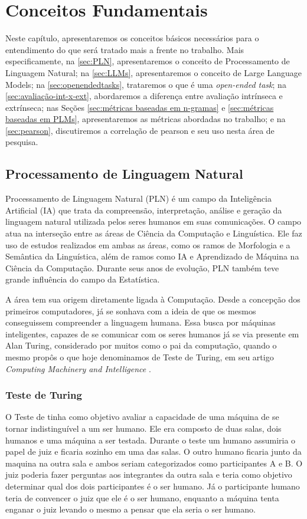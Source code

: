 \documentclass[cic,tc]{iiufrgs}
\begin{document}
\chapter{Conceitos Fundamentais}
\label{cap:conceitos fundamentais}
Neste capítulo, apresentaremos os conceitos básicos necessários para o entendimento do que será tratado mais a frente no trabalho. Mais especificamente, na \autoref{sec:PLN}, apresentaremos o conceito de Processamento de Linguagem Natural; na \autoref{sec:LLMs}, apresentaremos o conceito de Large Language Models; na \autoref{sec:openendedtasks}, trataremos o que é uma \textit{open-ended task}; na \autoref{sec:avaliação-int-x-ext}, abordaremos a diferença entre avaliação intrínseca e extrínseca; nas Seções \ref{sec:métricas baseadas em n-gramas} e \ref{sec:métricas baseadas em PLMs}, apresentaremos as métricas abordadas no trabalho; e na \autoref{sec:pearson}, discutiremos a correlação de pearson e seu uso nesta área de pesquisa.

\section{Processamento de Linguagem Natural}
\label{sec:PLN}
Processamento de Linguagem Natural (PLN) é um campo da Inteligência Artificial (IA) que trata da compreensão, interpretação, análise e geração da linguagem natural utilizada pelos seres humanos em suas comunicações. O campo atua na interseção entre as áreas de Ciência da Computação e Linguística. Ele faz uso de estudos realizados em ambas as áreas, como os ramos de Morfologia e a Semântica da Linguística, além de ramos como IA e Aprendizado de Máquina na Ciência da Computação. Durante seus anos de evolução, PLN também teve grande influência do campo da Estatística.

A área tem sua origem diretamente ligada à Computação. Desde a concepção dos primeiros computadores, já se sonhava com a ideia de que os mesmos conseguissem compreender a linguagem humana. Essa busca por máquinas inteligentes, capazes de se comunicar com os seres humanos já se via presente em Alan Turing, considerado por muitos como o pai da computação, quando o mesmo propôs o que hoje denominamos de Teste de Turing, em seu artigo \textit{Computing Machinery and Intelligence} \cite{alan1950a}. 

\subsection{Teste de Turing}
O Teste de \citet{alan1950a} tinha como objetivo avaliar a capacidade de uma máquina de se tornar indistinguível a um ser humano. Ele era composto de duas salas, dois humanos e uma máquina a ser testada. Durante o teste um humano assumiria o papel de juiz e ficaria sozinho em uma das salas. O outro humano ficaria junto da maquina na outra sala e ambos seriam categorizados como participantes A e B. O juiz poderia fazer perguntas aos integrantes da outra sala e teria como objetivo determinar qual dos dois participantes é o ser humano. Já o participante humano teria de convencer o juiz que ele é o ser humano, enquanto a máquina tenta enganar o juiz levando o mesmo a pensar que ela seria o ser humano. 
\end{document}
